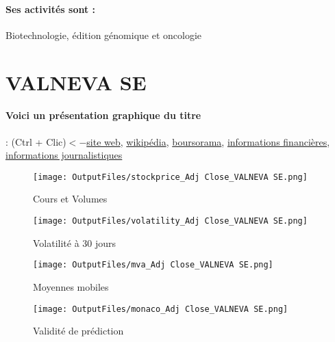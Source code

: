 \documentclass[11pt,a4paper]{report}%
\begin{document}
\paragraph{Ses activités sont : } Biotechnologie, édition génomique et oncologie 
    
    \newpage

\section{VALNEVA SE}

\paragraph{Voici un présentation graphique du titre} : (Ctrl + Clic)$<-$\href{https://valneva.com/?lang=fr}{site web}, \href{https://fr.wikipedia.org/wiki/Valneva_SE}{wikipédia}, \href{https://www.boursorama.com/cours/1rPVLA}{boursorama}, \href{https://www.qwant.com/?q=site:https:%2f%2fwww.easybourse.com%2faction-societe%2fVALNEVA-SE&t=web&client=ext-firefox-hp}{informations financières}, \href{https://bourse.lerevenu.com/cours-de-bourse/fiche-valeur-synthese/VALNEVA-SE/VLA-FR}{informations journalistiques}
\begin{figure}[!htb]
   \begin{minipage}{0.5\textwidth}
     \centering
     \texttt{[image: OutputFiles/stockprice\_Adj Close\_VALNEVA SE.png]}
     \caption{Cours et Volumes}\label{Fig:price_VALNEVA SE}
   \end{minipage}\hfill
   \begin{minipage}{0.5\textwidth}
     \centering
     \texttt{[image: OutputFiles/volatility\_Adj Close\_VALNEVA SE.png]}
     \caption{Volatilité à 30 jours}\label{Fig:volat_VALNEVA SE}
   \end{minipage}
\end{figure}
\begin{figure}[!htb]
   \begin{minipage}{0.5\textwidth}
     \centering
     \texttt{[image: OutputFiles/mva\_Adj Close\_VALNEVA SE.png]}
     \caption{Moyennes mobiles}\label{Fig:mva_VALNEVA SE}
   \end{minipage}\hfill
   \begin{minipage}{0.5\textwidth}
     \centering
     \texttt{[image: OutputFiles/monaco\_Adj Close\_VALNEVA SE.png]}
     \caption{Validité de prédiction}\label{Fig:prediction_VALNEVA SE}
   \end{minipage}
\end{figure}
\end{document}
